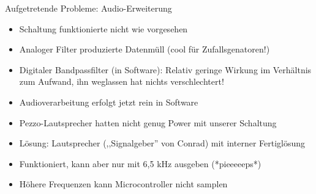\documentclass[fleqn,11pt]{beamer}
\begin{document}
\begin{frame}{Aufgetretende Probleme: Audio-Erweiterung}
	\begin{itemize}
	  \item  Schaltung funktionierte nicht wie vorgesehen
	  \item   Analoger Filter produzierte Datenmüll (cool für
	       Zufallsgenatoren!)
	     \item   Digitaler Bandpassfilter (in Software): Relativ
		  geringe Wirkung im
		     Verhältnis zum Aufwand, ihn weglassen hat nichts
		     verschlechtert!
		   \item	        Audioverarbeitung erfolgt jetzt rein in Software
		   \item   Pezzo-Lautsprecher hatten nicht genug Power
			   mit unserer Schaltung
			 \item 	      Lösung: Lautsprecher
			   (,,Signalgeber'' von Conrad) mit interner Fertiglösung
			 \item  Funktioniert, kann aber nur mit
				 6,5 kHz ausgeben (*pieeeeeps*)
			       \item	    Höhere Frequenzen kann  Microcontroller nicht samplen

	\end{itemize}
\end{frame}
\end{document}
